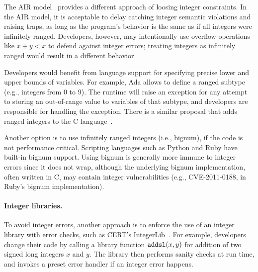 The AIR model~\cite{air} provides a different approach of loosing
integer constraints.  In the AIR model, it is acceptable to delay
catching integer semantic violations and raising traps, as long as the program's
behavior is the same as if all integers were infinitely ranged.
Developers, however, may intentionally use overflow operations like
$x + y < x$ to defend against integer errors; treating integers as
infinitely ranged would result in a different behavior.

Developers would benefit from language support for specifying precise
lower and upper bounds of variables.  For example, Ada allows to
define a ranged subtype (e.g., integers from 0 to 9).  The runtime
will raise an exception for any attempt to storing an out-of-range
value to variables of that subtype, and developers are responsible
for handling the exception.  There is a similar proposal that adds
ranged integers to the C language~\cite{ranged-c}.

Another option is to use infinitely ranged integers (i.e., bignum),
if the code is not performance critical.  Scripting languages such
as Python and Ruby have built-in bignum support.  Using bignum is
generally more immune to integer errors since it does not wrap,
although the underlying bignum implementation, often written in C,
may contain integer vulnerabilities (e.g., CVE-2011-0188,
in Ruby's bignum implementation).
%


\paragraph{Integer libraries.}
To avoid integer errors, another approach is to enforce the use of
an integer library with error checks, such as CERT's
IntegerLib~\cite[INT03-C]{seacord:secure-c}.  For example, developers
change their code by calling a library function $\texttt{addsl}(x, y)$
for addition of two signed long integers $x$ and $y$.  The library
then performs sanity checks at run time, and invokes a preset error
handler if an integer error happens.

